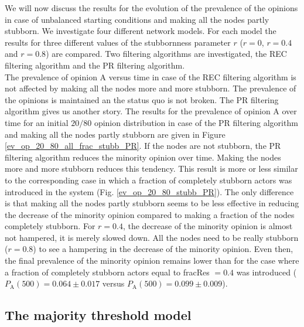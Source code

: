 \documentclass[11 pt , letterpaper , twoside , openright]{book}
\begin{document}
\noindent
We will now discuss the results for the evolution of the prevalence of the opinions in case of unbalanced starting conditions and making all the nodes partly stubborn. We investigate four different network models. For each model the results for three different values of the stubbornness parameter $r$ ($r=0$, $r=0.4$ and $r=0.8$) are compared. Two filtering algorithms are investigated, the REC filtering algorithm and the PR filtering algorithm.\\
\newline
The prevalence of opinion A versus time in case of the REC filtering algorithm is not affected by making all the nodes more and more stubborn. The prevalence of the opinions is maintained an the status quo is not broken. The PR filtering algorithm gives us another story. The results for the prevalence of opinion A over time for an initial $20/80$ opinion distribution in case of the PR filtering algorithm and making all the nodes partly stubborn are given in Figure \ref{ev_op_20_80_all_frac_stubb_PR}. If the nodes are not stubborn, the PR filtering algorithm reduces the minority opinion over time. Making the nodes more and more stubborn reduces this tendency. This result is more or less similar to the corresponding case in which a fraction of completely stubborn actors was introduced in the system (Fig. \ref{ev_op_20_80_stubb_PR}). The only difference is that making all the nodes partly stubborn seems to be less effective in reducing the decrease of the minority opinion compared to making a fraction of the nodes completely stubborn. For $r=0.4$, the decrease of the minority opinion is almost not hampered, it is merely slowed down. All the nodes need to be really stubborn ($r=0.8$) to see a hampering in the decrease of the minority opinion. Even then, the final prevalence of the minority opinion remains lower than for the case where a fraction of completely stubborn actors equal to fracRes $=0.4$ was introduced ($P_\text{A}(500) = 0.064 \pm 0.017$ versus $P_\text{A}(500) = 0.099 \pm 0.009$).

\subsection{The majority threshold model}
\label{majThres}
\end{document}

